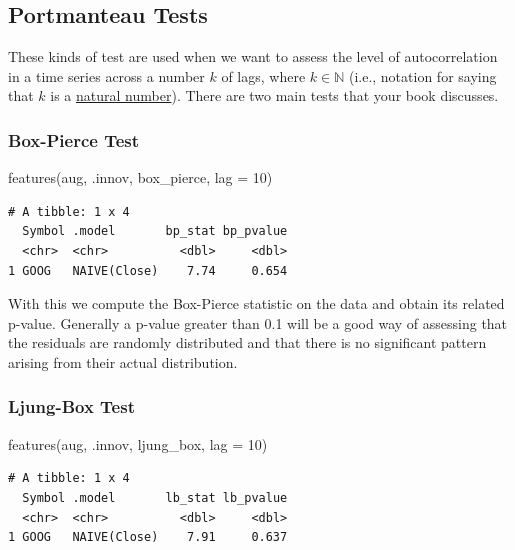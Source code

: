 \documentclass[
  letterpaper,
  DIV=11,
  numbers=noendperiod]{scrartcl}
\newenvironment{Shaded}{\begin{snugshade}}{\end{snugshade}}
\newcommand{\AttributeTok}[1]{\textcolor[rgb]{0.40,0.45,0.13}{#1}}
\newcommand{\DecValTok}[1]{\textcolor[rgb]{0.68,0.00,0.00}{#1}}
\newcommand{\FunctionTok}[1]{\textcolor[rgb]{0.28,0.35,0.67}{#1}}
\newcommand{\NormalTok}[1]{\textcolor[rgb]{0.00,0.23,0.31}{#1}}
\begin{document}
\subsection{Portmanteau Tests}\label{portmanteau-tests}

These kinds of test are used when we want to assess the level of
autocorrelation in a time series across a number \(k\) of lags, where
\(k \in \mathbb{N}\) (i.e., notation for saying that \(k\) is a
\href{https://www.cuemath.com/numbers/natural-numbers/}{natural
number}). There are two main tests that your book discusses.

\subsubsection{Box-Pierce Test}\label{box-pierce-test}

\begin{Shaded}
\begin{Highlighting}[]
\FunctionTok{features}\NormalTok{(aug, .innov, box\_pierce, }\AttributeTok{lag =} \DecValTok{10}\NormalTok{)}
\end{Highlighting}
\end{Shaded}

\begin{verbatim}
# A tibble: 1 x 4
  Symbol .model       bp_stat bp_pvalue
  <chr>  <chr>          <dbl>     <dbl>
1 GOOG   NAIVE(Close)    7.74     0.654
\end{verbatim}

With this we compute the Box-Pierce statistic on the data and obtain its
related p-value. Generally a p-value greater than 0.1 will be a good way
of assessing that the residuals are randomly distributed and that there
is no significant pattern arising from their actual distribution.

\subsubsection{Ljung-Box Test}\label{ljung-box-test}

\begin{Shaded}
\begin{Highlighting}[]
\FunctionTok{features}\NormalTok{(aug, .innov, ljung\_box, }\AttributeTok{lag =} \DecValTok{10}\NormalTok{)}
\end{Highlighting}
\end{Shaded}

\begin{verbatim}
# A tibble: 1 x 4
  Symbol .model       lb_stat lb_pvalue
  <chr>  <chr>          <dbl>     <dbl>
1 GOOG   NAIVE(Close)    7.91     0.637
\end{verbatim}
\end{document}
